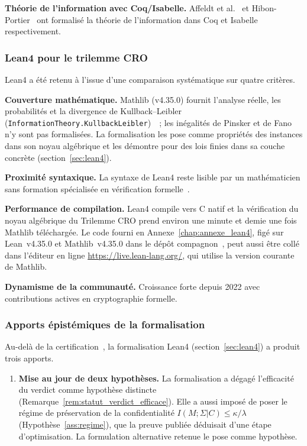 \begin{sloppypar}
\textbf{Th\'eorie de l'information avec Coq/Isabelle.} Affeldt et al.~\cite{Affeldt2015}
et Hibon-Portier~\cite{HibonPortier20} ont formalis\'e la th\'eorie de l'information
dans Coq et Isabelle respectivement.

\subsubsection{Lean4 pour le trilemme CRO}
\label{subsubsec:lean4_trilemme}

Lean4 a \'et\'e retenu \`a l'issue d'une comparaison syst\'ematique sur quatre crit\`eres.

\textbf{Couverture math\'ematique.} Mathlib (v4.35.0) fournit l'analyse r\'eelle,
les probabilit\'es et la divergence de Kullback--Leibler
(\texttt{InformationTheory.KullbackLeibler})~\cite{Mathlib}~; les in\'egalit\'es
de Pinsker et de Fano n'y sont pas formalis\'ees. La formalisation les pose comme
propri\'et\'es des instances dans son noyau alg\'ebrique et les d\'emontre pour des lois
finies dans sa couche concr\`ete (section~\ref{sec:lean4}).

\textbf{Proximit\'e syntaxique.} La syntaxe de Lean4 reste lisible par un
math\'ematicien sans formation sp\'ecialis\'ee en v\'erification formelle~\cite{moura2015lean}.

\textbf{Performance de compilation.} Lean4 compile vers C natif et
la v\'erification du noyau alg\'ebrique du Trilemme CRO prend environ une
minute et demie une fois Mathlib t\'el\'echarg\'ee. Le code fourni en
Annexe~\ref{chap:annexe_lean4}, fig\'e sur Lean~v4.35.0 et Mathlib~v4.35.0 dans le
d\'ep\^ot compagnon~\cite{CROTrilemmaDepot}, peut aussi \^etre coll\'e dans
l'\'editeur en ligne \url{https://live.lean-lang.org/}, qui utilise la version
courante de Mathlib.

\textbf{Dynamisme de la communaut\'e.} Croissance forte depuis 2022 avec
contributions actives en cryptographie formelle.

\subsubsection{Apports \'epist\'emiques de la formalisation}
\label{subsubsec:apports_epistemiques}

Au-del\`a de la certification~\cite{AbadiRogaway00,BanaComon12}, la formalisation
Lean4 (section~\ref{sec:lean4}) a produit trois apports.

\begin{enumerate}
\item \textbf{Mise au jour de deux hypoth\`eses.} La formalisation a d\'egag\'e
l'efficacit\'e du verdict comme hypoth\`ese distincte
(Remarque~\ref{rem:statut_verdict_efficace}). Elle a aussi impos\'e de poser
le r\'egime de pr\'eservation de la confidentialit\'e
$I(M;\Sigma|C) \leq \kappa/\lambda$ (Hypoth\`ese~\ref{ass:regime}), que la preuve
publi\'ee d\'eduisait d'une \'etape d'optimisation. La formulation alternative
retenue le pose comme hypoth\`ese.


\end{enumerate}
\end{sloppypar}
